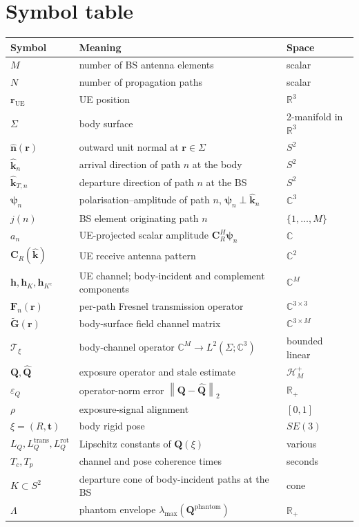 \documentclass[11pt,a4paper]{article}
\theoremstyle{definition}
\newcommand{\rr}{\mathbf{r}}
\newcommand{\hh}{\mathbf{h}}
\newcommand{\nh}{\hat{\mathbf{n}}}
\newcommand{\kh}{\hat{\mathbf{k}}}
\newcommand{\Q}{\mathbf{Q}}
\newcommand{\Qhat}{\widehat{\mathbf{Q}}}
\newcommand{\Gt}{\widetilde{\mathbf{G}}}
\newcommand{\F}{\mathbf{F}}
\newcommand{\Cp}{\mathbf{C}}
\newcommand{\psib}{\boldsymbol{\psi}}
\newcommand{\Sigmaset}{\Sigma}
\newcommand{\C}{\mathbb{C}}
\newcommand{\R}{\mathbb{R}}
\newcommand{\lammax}{\lambda_{\max}}
\newcommand{\norm}[1]{\left\lVert #1 \right\rVert}
\newcommand{\Top}{\mathcal{T}}
\begin{document}
\section{Symbol table}
\label{app:symbols}

\begin{center}
\small
\begin{tabular}{lp{8cm}l}
\toprule
Symbol & Meaning & Space \\
\midrule
$M$ & number of BS antenna elements & scalar \\
$N$ & number of propagation paths & scalar \\
$\rr_{\mathrm{UE}}$ & UE position & $\R^3$ \\
$\Sigmaset$ & body surface & 2-manifold in $\R^3$ \\
$\nh(\rr)$ & outward unit normal at $\rr\in\Sigmaset$ & $S^2$ \\
$\kh_n$ & arrival direction of path $n$ at the body & $S^2$ \\
$\kh_{T,n}$ & departure direction of path $n$ at the BS & $S^2$ \\
$\psib_n$ & polarisation--amplitude of path $n$, $\psib_n\perp\kh_n$ & $\C^3$ \\
$j(n)$ & BS element originating path $n$ & $\{1,\dots,M\}$ \\
$a_n$ & UE-projected scalar amplitude $\Cp_R^H\psib_n$ & $\C$ \\
$\Cp_R(\kh)$ & UE receive antenna pattern & $\C^2$ \\
$\hh, \hh_K, \hh_{K^c}$ & UE channel; body-incident and complement components & $\C^M$ \\
$\F_n(\rr)$ & per-path Fresnel transmission operator & $\C^{3\times 3}$ \\
$\Gt(\rr)$ & body-surface field channel matrix & $\C^{3\times M}$ \\
$\Top_\xi$ & body-channel operator $\C^M\to L^2(\Sigmaset;\C^3)$ & bounded linear \\
$\Q,\Qhat$ & exposure operator and stale estimate & $\mathcal{H}_M^+$ \\
$\varepsilon_Q$ & operator-norm error $\norm{\Q-\Qhat}_2$ & $\R_+$ \\
$\rho$ & exposure-signal alignment & $[0,1]$ \\
$\xi=(R,\mathbf{t})$ & body rigid pose & $SE(3)$ \\
$L_Q,L_Q^{\mathrm{trans}},L_Q^{\mathrm{rot}}$ & Lipschitz constants of $\Q(\xi)$ & various \\
$T_c, T_p$ & channel and pose coherence times & seconds \\
$K\subset S^2$ & departure cone of body-incident paths at the BS & cone \\
$\Lambda$ & phantom envelope $\lammax(\Q^{\mathrm{phantom}})$ & $\R_+$ \\
\bottomrule
\end{tabular}
\end{center}
\end{document}

